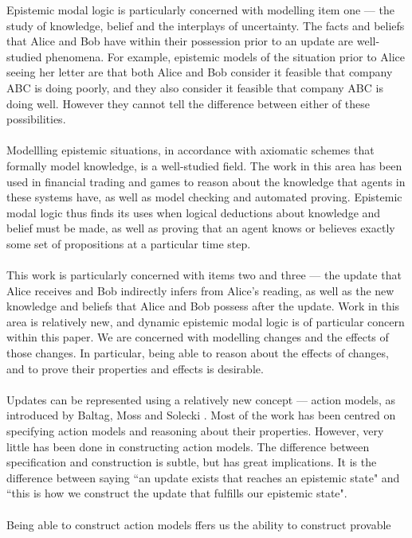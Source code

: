 Epistemic modal logic is particularly concerned with modelling item one --- the study of knowledge,
belief and the interplays of uncertainty.
The facts and beliefs that Alice and Bob have within their possession prior to an update are well-studied phenomena.
For example, epistemic models of the situation prior to Alice seeing her letter are that both Alice
and Bob consider it feasible that company ABC is doing poorly, and they also consider it feasible
that company ABC is doing well.
However they cannot tell the difference between either of these possibilities.\\
\\
Modellling epistemic situations, in accordance with axiomatic schemes that
formally model knowledge, is a well-studied field.
The work in this area has been used in financial trading and games to reason about the knowledge
that agents in these systems have, as well as model checking and automated proving.
Epistemic modal logic thus finds its uses when logical deductions about knowledge and belief must be
made, as well as proving that an agent knows or believes exactly some set of propositions at a
particular time step.\\
\\
This work is particularly concerned with items two and  three --- the update that Alice receives and Bob
indirectly infers from Alice's reading, as well as the new knowledge and beliefs that Alice and Bob
possess after the update.
Work in this area is relatively new, and dynamic epistemic modal logic is of particular concern
within this paper.
We are concerned with modelling changes and the effects of those changes.
In particular, being able to reason about the effects of changes, and to prove their properties and
effects is desirable.\\
\\
Updates can be represented using a relatively new concept --- action models, as
introduced by Baltag, Moss and Solecki \cite{baltag1998lpa}.
Most of the work has been centred on specifying action models and reasoning
about their properties.
However, very little has been done in constructing action models.
The difference between specification and construction is subtle, but has great
implications.
It is the difference between saying ``an update exists that reaches an epistemic
state" and ``this is how we construct the update that fulfills our epistemic state".\\
\\
Being able to construct action models ffers us the ability to construct provable 
